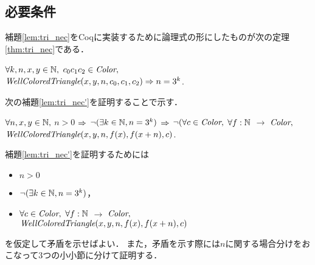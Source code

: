 \subsection{必要条件}
補題\ref{lem:tri_nec}をCoqに実装するために論理式の形にしたものが次の定理\ref{thm:tri_nec}である．
\begin{thm}[必要条件] \label{thm:tri_nec}
  $\forall k, n, x, y \in \mathbb{N},$ $c_0 c_1 c_2 \in \textit{Color}, $ \\
  $\textit{WellColoredTriangle}(x,y,n,c_0,c_1,c_2) \Rightarrow n = 3 ^ k$.
\end{thm}
次の補題\ref{lem:tri_nec'}を証明することで示す．
\begin{lem}[必要条件の対偶] \label{lem:tri_nec'}
  $\forall n, x, y \in \mathbb{N},$ $n > 0$ $\Rightarrow$ 
  $\lnot(\exists k \in \mathbb{N}, n = 3 ^ k)$ $\Rightarrow$
  $\lnot( \forall c \in \textit{Color},$
  $\forall f:\mathbb{N}$ $\to$ $\textit{Color},$
  $\textit{WellColoredTriangle}(x,y,n,f(x),f(x+n),c)$.
\end{lem}
補題\ref{lem:tri_nec'}を証明するためには
\begin{itemize}
\item
  $n > 0$
\item
  $\lnot(\exists k \in \mathbb{N}, n = 3 ^ k)$，
\item
  $\forall c \in \textit{Color},$ $\forall f:\mathbb{N}$ $\to$ $\textit{Color},$ \\
  $\textit{WellColoredTriangle}(x,y,n,f(x),f(x+n),c)$
\end{itemize}
を仮定して矛盾を示せばよい．
また，矛盾を示す際には$n$に関する場合分けをおこなって$3$つの小小節に分けて証明する．
